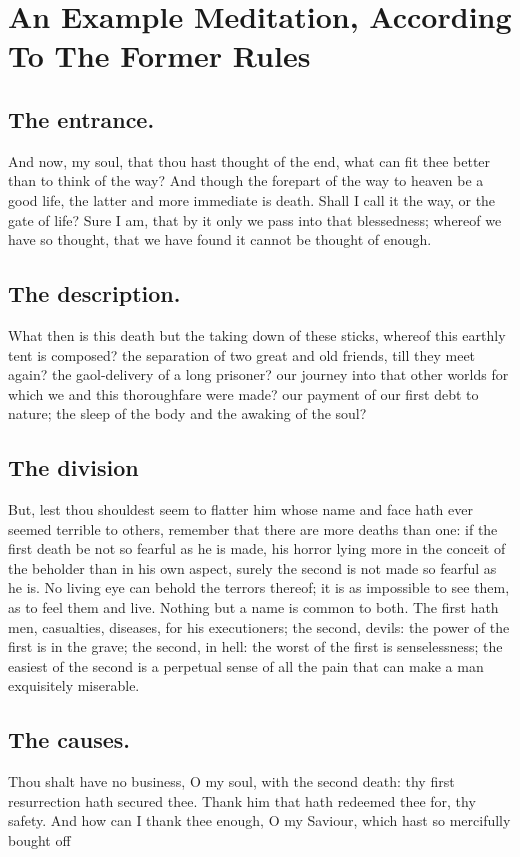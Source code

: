 \meditation
\chapter{An Example Meditation, According To The Former Rules}
\section{The entrance.}
And now, my soul, that thou hast thought of the end, what can fit thee better than to think of the way? And though the forepart of the way to heaven be a good life, the latter and more immediate is death. Shall I call it the way, or the gate of life? Sure I am, that by it only we pass into that blessedness; whereof we have so thought, that we have found it cannot be thought of enough. 

\section{The description.}
What then is this death but the taking down of these sticks, whereof this earthly tent is composed? the separation of two great and old friends, till they meet again? the gaol-delivery of a long prisoner? our journey into that other worlds for which we and this thoroughfare were made? our payment of our first debt to nature; the sleep of the body and the awaking of the soul? 

\section{The division}
But, lest thou shouldest seem to flatter him whose name and face hath ever seemed terrible to others, remember that there are more deaths than one: if the first death be not so fearful as he is made, his horror lying more in the conceit of the beholder than in his own aspect, surely the second is not made so fearful as he is. No living eye can behold the terrors thereof; it is as impossible to see them, as to feel them and live. Nothing but a name is common to both. The first hath men, casualties, diseases, for his executioners; the second, devils: the power of the first is in the grave; the second, in hell: the worst of the first is senselessness; the easiest of the second is a perpetual sense of all the pain that can make a man exquisitely miserable. 

\section{The causes.}
Thou shalt have no business, O my soul, with the second death: thy first resurrection hath secured thee. Thank him that hath redeemed thee for, thy safety. And how can I thank thee enough, O my Saviour, which hast so mercifully bought off 
 